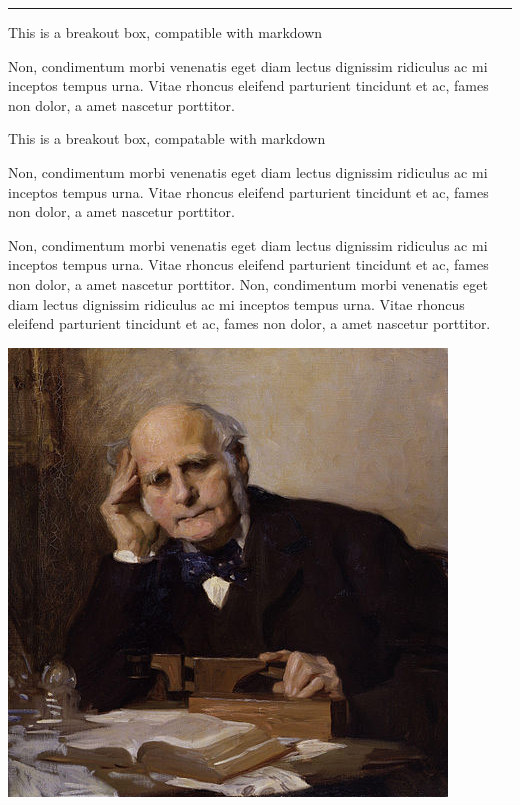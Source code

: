 \documentclass[
  oneside,
  12pt]{crumpbook}
\newenvironment{floatrightbox25}{%
  \wrapfigure{R}{.25\textwidth}%
  }{%
  \endwrapfigure}
\begin{document}
\begin{center}\rule{0.5\linewidth}{0.5pt}\end{center}

This is a breakout box, compatible with markdown

Non, condimentum morbi venenatis eget diam lectus dignissim ridiculus ac mi inceptos tempus urna. Vitae rhoncus eleifend parturient tincidunt et ac, fames non dolor, a amet nascetur porttitor.

This is a breakout box, compatable with markdown

Non, condimentum morbi venenatis eget diam lectus dignissim ridiculus ac mi inceptos tempus urna. Vitae rhoncus eleifend parturient tincidunt et ac, fames non dolor, a amet nascetur porttitor.

Non, condimentum morbi venenatis eget diam lectus dignissim ridiculus ac mi inceptos tempus urna. Vitae rhoncus eleifend parturient tincidunt et ac, fames non dolor, a amet nascetur porttitor. Non, condimentum morbi venenatis eget diam lectus dignissim ridiculus ac mi inceptos tempus urna. Vitae rhoncus eleifend parturient tincidunt et ac, fames non dolor, a amet nascetur porttitor.

\begin{floatrightbox25}
\includegraphics[width=1\linewidth]{imgs/Francis_Galton}

\end{floatrightbox25}
\end{document}
